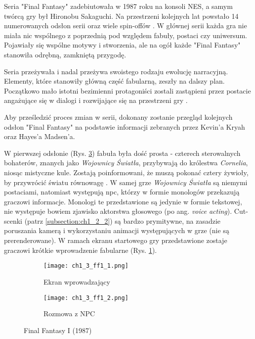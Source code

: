 Seria "Final Fantasy" zadebiutowała w 1987 roku na konsoli NES, a samym twórcą gry był Hironobu
Sakaguchi. Na przestrzeni kolejnych lat powstało 14 numerowanych odsłon serii oraz wiele spin-offów
\cite{the_evolution_of_final_fantasy}. W głównej serii każda gra nie miała nic wspólnego z poprzednią
pod względem fabuły, postaci czy uniwersum. Pojawiały się wspólne motywy i stworzenia, ale na ogół
każde "Final Fantasy" stanowiła odrębną, zamkniętą przygodę\cite{the_evolution_of_final_fantasy}.

Seria przeżywała i nadal przeżywa swoistego rodzaju ewolucję narracyjną. Elementy, które stanowiły
główną część fabularną, zeszły na dalszy plan. Początkowo mało istotni bezimienni protagoniści zostali
zastąpieni przez postacie angażujące się w dialogi i rozwijające się na przestrzeni gry
\cite{the_evolution_of_final_fantasy}.

Aby prześledzić proces zmian w serii, dokonany zostanie przegląd kolejnych odsłon "Final Fantasy" na
podstawie informacji zebranych przez Kevin'a Kryah\cite{the_evolution_of_final_fantasy} oraz
Hayes'a Madsen'a\cite{25_years_later}.

W pierwszej odsłonie (Rys. \ref{fig:ch1_3_ff1}) fabuła była dość prosta - czterech sterowalnych
bohaterów, znanych jako \textit{Wojownicy Światła}, przybywają do królestwa \textit{Cornelia}, niosąc
mistyczne kule. Zostają poinformowani, że muszą pokonać cztery żywioły, by przywrócić światu równowagę
\cite{the_evolution_of_final_fantasy}. W samej grze \textit{Wojownicy Światła} są niemymi postaciami,
natomiast występują \gls{npc}, którzy w formie monologów przekazują
graczowi informacje. Monologi te przedstawione są jedynie w formie tekstowej, nie występuje bowiem
zjawisko aktorstwa głosowego (po ang. \textit{voice acting}). Cut-scenki (patrz \ref{subsection:ch1_2_2})
są bardzo prymitywne, na zasadzie poruszania kamerą i wykorzystaniu animacji występujących w grze
(nie są prerenderowane). W ramach ekranu startowego gry przedstawione zostaje graczowi krótkie
wprowadzenie fabularne (Rys. \ref{subfig:ch_1_3_ff1}).

\begin{figure}[h]
	\begin{subfigure}{0.49\textwidth}
		\caption{Ekran wprowadzający}
		\texttt{[image: ch1\_3\_ff1\_1.png]}
		\label{subfig:ch_1_3_ff1}
	\end{subfigure}
	\begin{subfigure}{0.49\textwidth}
		\caption{Rozmowa z NPC}
		\texttt{[image: ch1\_3\_ff1\_2.png]}
		\label{subfig:ch_1_3_ff1_2}
	\end{subfigure}
	\caption{Final Fantasy I (1987)}
	\label{fig:ch1_3_ff1}
\end{figure}

